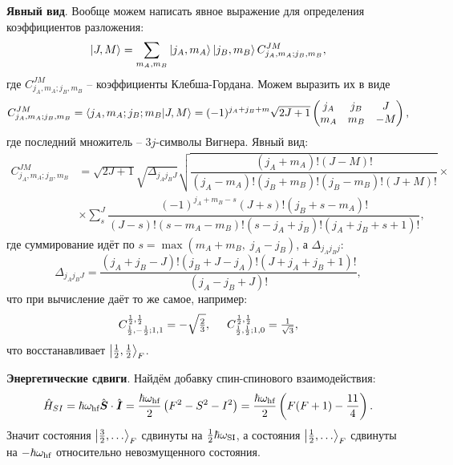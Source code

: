 \textbf{Явный вид}. Вообще можем написать явное выражение для определения коэффициентов разложения:
\begin{equation*}
    \left| J, M \right\rangle = \sum_{m_A, m_B} \left| j_A, m_A \right\rangle \left| j_B, m_B \right\rangle C^{JM}_{j_A,m_A; j_B, m_B},
\end{equation*}
где $C^{JM}_{j_A,m_A; j_B, m_B}$ -- коэффициенты Клебша-Гордана. Можем выразить их в виде
\begin{equation*}
    C^{JM}_{j_A,m_A; j_B, m_B} = \bk{j_A, m_A; j_B; m_B}{J, M} = (-1)^{j_A + j_B + m} \sqrt{2 J + 1} \begin{pmatrix}
        j_A & j_B & J \\
        m_A & m_B & -M
    \end{pmatrix},
\end{equation*}
где последний множитель -- $3j$-символы Вигнера. Явный вид:
\begin{align*}
    C^{JM}_{j_A,m_A; j_B, m_B} &= {\sqrt {2J+1}}{\sqrt {\Delta _{j_A j_B J}}}{\sqrt {\dfrac {(j_A +m_A)!(J-M)!}{(j_A -m_A)!(j_B +m_B)!(j_B -m_B)!(J+M)!}}} \times  \\
    &\times \sum _{s}^{J}{\dfrac {(-1)^{j_A +m_B-s}(J+s)!(j_B +s-m_A)!}{(J-s)!(s-m_A-m_B)!(s-j_A +j_B )!(j_A +j_B +s+1)!}}, 
\end{align*}
где суммирование идёт по $s =\max(m_A+m_B,\;j_A -j_B )$,  а $\Delta _{j_A j_B j}$:
\begin{equation*}
     \Delta _{j_A j_B J}={\frac {(j_A +j_B -J)!(j_B +J-j_A )!(J+j_A +j_B +1)!}{(j_A -j_B +J)!}},
\end{equation*}
что при вычисление даёт то же самое, например:
\begin{equation*}
    C^{\frac{1}{2}, \frac{1}{2}}_{\frac{1}{2},-\frac{1}{2}; 1, 1} = - \sqrt{\tfrac{2}{3}}, \hspace{5 mm} 
    C^{\frac{1}{2}, \frac{1}{2}}_{\frac{1}{2},\frac{1}{2}; 1, 0} = \tfrac{1}{\sqrt{3}},
\end{equation*}
что восстанавливает $\left| \tfrac{1}{2}, \tfrac{1}{2} \right\rangle_F$.

\textbf{Энергетические сдвиги}. Найдём добавку спин-спинового взаимодействия:
\begin{equation*}
    \hat{H}_{SI} = \hbar \omega_{\textnormal{hf}} \hat{\mbox{\boldmath $S$}} \cdot \hat{\mbox{\boldmath $I$}} = 
    \frac{\hbar \omega_{\textnormal{hf}}}{2} \left(F^2 - S^2 - I^2\right) = \frac{\hbar \omega_{\textnormal{hf}}}{2}\left(F(F+1)-\frac{11}{4}\right).
\end{equation*}
Значит состояния $\left| \tfrac{3}{2},\ldots \right\rangle_F$ сдвинуты на $\tfrac{1}{2} \hbar \omega_{\textnormal{SI}}$, а состояния $\left| \tfrac{1}{2},\ldots \right\rangle_{F}$ сдвинуты на $- \hbar \omega_{\textnormal{hf}}$ относительно невозмущенного состояния.


